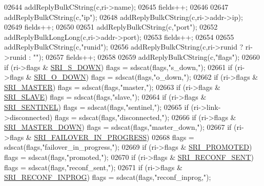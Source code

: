 \begin{DoxyCode}
{{{{{{{{{{{{{{{{{{{{{{{{{{{{{{{{{{{{{{{{{{{{{{{{{{{{{{{{{02644     addReplyBulkCString(c,ri->name);
02645     fields++;
02646 
02647     addReplyBulkCString(c,\textcolor{stringliteral}{"ip"});
02648     addReplyBulkCString(c,ri->addr->ip);
02649     fields++;
02650 
02651     addReplyBulkCString(c,\textcolor{stringliteral}{"port"});
02652     addReplyBulkLongLong(c,ri->addr->port);
02653     fields++;
02654 
02655     addReplyBulkCString(c,\textcolor{stringliteral}{"runid"});
02656     addReplyBulkCString(c,ri->runid ? ri->runid : \textcolor{stringliteral}{""});
02657     fields++;
02658 
02659     addReplyBulkCString(c,\textcolor{stringliteral}{"flags"});
02660     \textcolor{keywordflow}{if} (ri->flags & \hyperlink{sentinel_8c_a8e26596c8bde451c2dd9cecb2c3046d4}{SRI\_S\_DOWN}) flags = sdscat(flags,\textcolor{stringliteral}{"s\_down,"});
02661     \textcolor{keywordflow}{if} (ri->flags & \hyperlink{sentinel_8c_a3bbbca05543cd9d9f86d276e2c7c719c}{SRI\_O\_DOWN}) flags = sdscat(flags,\textcolor{stringliteral}{"o\_down,"});
02662     \textcolor{keywordflow}{if} (ri->flags & \hyperlink{sentinel_8c_a2ee83e5ff67b45746cd6a310f15334b2}{SRI\_MASTER}) flags = sdscat(flags,\textcolor{stringliteral}{"master,"});
02663     \textcolor{keywordflow}{if} (ri->flags & \hyperlink{sentinel_8c_a4b9db21eda79d49bd9fdf2cf7b3178e8}{SRI\_SLAVE}) flags = sdscat(flags,\textcolor{stringliteral}{"slave,"});
02664     \textcolor{keywordflow}{if} (ri->flags & \hyperlink{sentinel_8c_a8ed55207b2af5d2dd314c951ef253f64}{SRI\_SENTINEL}) flags = sdscat(flags,\textcolor{stringliteral}{"sentinel,"});
02665     \textcolor{keywordflow}{if} (ri->link->disconnected) flags = sdscat(flags,\textcolor{stringliteral}{"disconnected,"});
02666     \textcolor{keywordflow}{if} (ri->flags & \hyperlink{sentinel_8c_a80003592a6337bdc484182ff1d33e41c}{SRI\_MASTER\_DOWN}) flags = sdscat(flags,\textcolor{stringliteral}{"master\_down,"});
02667     \textcolor{keywordflow}{if} (ri->flags & \hyperlink{sentinel_8c_a0546b63633196f09fcd90957243b0798}{SRI\_FAILOVER\_IN\_PROGRESS})
02668         flags = sdscat(flags,\textcolor{stringliteral}{"failover\_in\_progress,"});
02669     \textcolor{keywordflow}{if} (ri->flags & \hyperlink{sentinel_8c_a6c6c019b1af48a9c0e9507422051c684}{SRI\_PROMOTED}) flags = sdscat(flags,\textcolor{stringliteral}{"promoted,"});
02670     \textcolor{keywordflow}{if} (ri->flags & \hyperlink{sentinel_8c_a9b307b68cb1615ead6aacb0de34910e6}{SRI\_RECONF\_SENT}) flags = sdscat(flags,\textcolor{stringliteral}{"reconf\_sent,"});
02671     \textcolor{keywordflow}{if} (ri->flags & \hyperlink{sentinel_8c_a58c89f4aaa1bdfde4c25e3bb476c35aa}{SRI\_RECONF\_INPROG}) flags = sdscat(flags,\textcolor{stringliteral}{"reconf\_inprog,"});
}}}}}}}}}}}}}}}}}}}}}}}}}}}}}}}}}}}}}}}}}}}}}}}}}}}}}}}}}
\end{DoxyCode}
